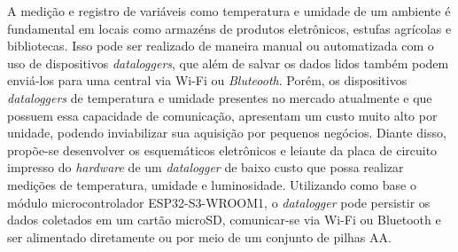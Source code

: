 

A medição e registro de variáveis como temperatura e umidade de um ambiente é fundamental em locais como armazéns de produtos eletrônicos, estufas agrícolas e bibliotecas. Isso pode ser realizado de maneira manual ou automatizada com o uso de dispositivos \textit{dataloggers}, que além de salvar os dados lidos também podem enviá-los para uma central via Wi-Fi ou \textit{Bluteooth}. Porém, os dispositivos \textit{dataloggers} de temperatura e umidade presentes no mercado atualmente e que possuem essa capacidade de comunicação, apresentam um custo muito alto por unidade, podendo inviabilizar sua aquisição por pequenos negócios. Diante disso, propõe-se desenvolver os esquemáticos eletrônicos e leiaute da placa de circuito impresso do \textit{hardware} de um \textit{datalogger} de baixo custo que possa realizar medições de temperatura, umidade e luminosidade. Utilizando como base o módulo microcontrolador ESP32-S3-WROOM1, o \textit{datalogger} pode persistir os dados coletados em um cartão microSD, comunicar-se via Wi-Fi ou Bluetooth e ser alimentado diretamente ou por meio de um conjunto de pilhas AA. 
































